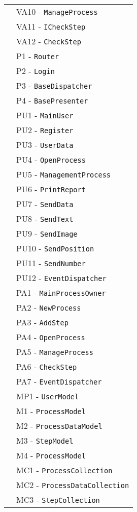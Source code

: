 \begin{longtable}{XX}
&VA10 - \texttt{ManageProcess}\\ 
&VA11 - \texttt{ICheckStep}\\ 
&VA12 - \texttt{CheckStep}\\ 
\midrule
\logic{} &P1 - \texttt{Router}\\ 
&P2 - \texttt{Login}\\ 
&P3 - \texttt{BaseDispatcher}\\
&P4 - \texttt{BasePresenter}\\  
\logicUser{}&PU1 - \texttt{MainUser}\\ 
&PU2 - \texttt{Register}\\ 
&PU3 - \texttt{UserData}\\ 
&PU4 - \texttt{OpenProcess}\\ 
&PU5 - \texttt{ManagementProcess}\\ 
&PU6 - \texttt{PrintReport}\\ 
&PU7 - \texttt{SendData}\\ 
&PU8 - \texttt{SendText}\\ 
&PU9 - \texttt{SendImage}\\ 
&PU10 - \texttt{SendPosition}\\ 
&PU11 - \texttt{SendNumber}\\
&PU12 - \texttt{EventDispatcher}\\
\midrule
\logicAdmin{}&PA1 - \texttt{MainProcessOwner}\\
&PA2 - \texttt{NewProcess}\\ 
&PA3 - \texttt{AddStep}\\ 
&PA4 - \texttt{OpenProcess}\\ 
&PA5 - \texttt{ManageProcess}\\ 
&PA6 - \texttt{CheckStep}\\ 
&PA7 - \texttt{EventDispatcher}\\ 

\midrule
\model{}&MP1 - \texttt{UserModel}\\
\midrule

\modelUser{}&M1 - \texttt{ProcessModel}\\
&M2 - \texttt{ProcessDataModel}\\
&M3 - \texttt{StepModel}\\
&M4 - \texttt{ProcessModel}\\
\midrule
\collectionu{}&MC1 - \texttt{{ProcessCollection}}\\
&MC2 - \texttt{{ProcessDataCollection}}\\
&MC3 - \texttt{{StepCollection}}\\
\midrule


\end{longtable}
